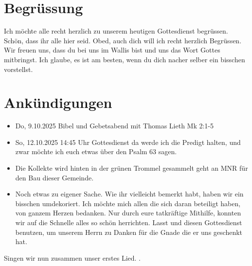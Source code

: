 \documentclass{../../inc/mybib}
\begin{document}
\section{Begrüssung}
Ich möchte alle recht herzlich zu unserem heutigen Gottesdienst begrüssen. Schön, dass ihr alle hier seid. Obed, auch dich will ich recht herzlich Begrüssen. Wir freuen uns, dass du bei uns im Wallis bist und uns das Wort Gottes mitbringst. Ich glaube, es ist am besten, wenn du dich nacher selber ein bisschen vorstellst.

\beten{}

\section{Ankündigungen}
\begin{itemize}
    \item {} Do,  9.10.2025 Bibel und Gebetsabend mit Thomas Lieth Mk 2:1-5
    \item {} So, 12.10.2025 14:45 Uhr Gottesdienst da werde ich die Predigt halten, und zwar möchte ich euch etwas über den Psalm 63 sagen.    
    \item Die Kollekte wird hinten in der grünen Trommel gesammelt geht an MNR für den Bau dieser Gemeinde.
    \item Noch etwas zu eigener Sache. Wie ihr vielleicht bemerkt habt, haben wir ein bisschen umdekoriert. Ich möchte mich allen die sich daran beteiligt haben, von ganzem Herzen bedanken. Nur durch eure tatkräftige Mithilfe, konnten wir auf die Schnelle alles so schön herrichten. Lasst und diesen Gottesdienst benutzen, um unserem Herrn zu Danken für die Gnade die er uns geschenkt hat.
\end{itemize}

Singen wir nun zusammen unser erstes Lied.
{}.
\end{document}
